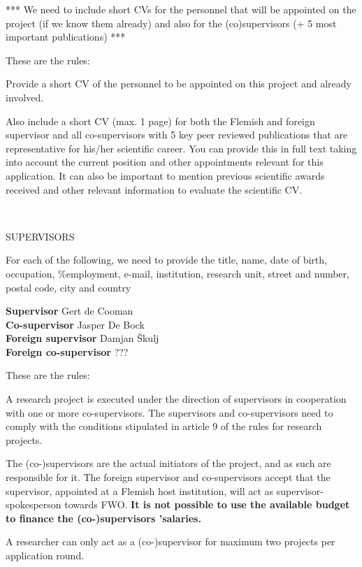 \documentclass[11pt,dvipsnames,usenames,a4paper]{article}
\begin{document}
*** We need to include short CVs for the personnel that will be appointed on the project (if we know them already) and also for the (co)supervisors (+ 5 most important publications)  ***

{\color{Gray}
These are the rules:

Provide a short CV of the personnel to be appointed on this project and already involved. 

Also include a short CV (max. 1 page) for both the Flemish and foreign supervisor and all co-supervisors with 5 key peer reviewed publications that are representative for his/her scientific career. You can provide this in full text taking into account the current position and other appointments relevant for this application. It can also be important to mention previous scientific awards received and other relevant information to evaluate the scientific CV.}\\

\begin{shaded}\centering SUPERVISORS \end{shaded}

For each of the following, we need to provide the title, name, date of birth, occupation, \%employment, e-mail, institution, research unit, street and number, postal code, city and country

\textbf{Supervisor} \tab Gert de Cooman\\
\textbf{Co-supervisor} \tab Jasper De Bock\\
\textbf{Foreign supervisor} \tab Damjan {\v S}kulj\\
\textbf{Foreign co-supervisor} \tab ???\\

\vspace{5pt}

{\color{Gray}
These are the rules:

A research project is executed under the direction of supervisors in cooperation with one or more co-supervisors. The supervisors and co-supervisors need to comply with the conditions stipulated in article 9 of the rules for research projects.

The (co-)supervisors are the actual initiators of the project, and as such are responsible for it. The foreign supervisor and co-supervisors accept that the supervisor, appointed at a Flemish host institution, will act as supervisor-spokesperson towards FWO. {\bf It is not possible to use the available budget to finance the (co-)supervisors ’salaries.}

A researcher can only act as a (co-)supervisor for maximum two projects per application round.
}
\end{document}
